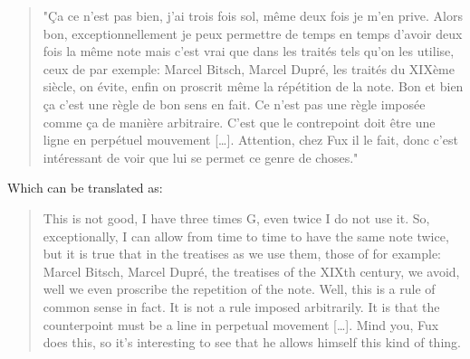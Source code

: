 \begin{quotation}
    "Ça ce n'est pas bien, j'ai trois fois sol, même deux fois je m'en prive. Alors bon, exceptionnellement je peux permettre de temps en temps d'avoir deux fois la même note mais c'est vrai que dans les traités tels qu'on les utilise, ceux de par exemple: Marcel Bitsch, Marcel Dupré, les traités du XIXème siècle, on évite, enfin on proscrit même la répétition de la note. Bon et bien ça c'est une règle de bon sens en fait. Ce n'est pas une règle imposée comme ça de manière arbitraire. C'est que le contrepoint doit être une ligne en perpétuel mouvement [\dots]. Attention, chez Fux il le fait, donc c'est intéressant de voir que lui se permet ce genre de choses."
    \textcite[Jean-Louis Fabre's opinion on the repetition of the same note in counterpoint.][1min 11]{ReglesJLFabre}
    \label{appen:JLFabreAvis}
\end{quotation}

Which can be translated as:
\begin{quotation}
    This is not good, I have three times G, even twice I do not use it. So, exceptionally, I can allow from time to time to have the same note twice, but it is true that in the treatises as we use them, those of for example: Marcel Bitsch, Marcel Dupré, the treatises of the XIXth century, we avoid, well we even proscribe the repetition of the note. Well, this is a rule of common sense in fact. It is not a rule imposed arbitrarily. It is that the counterpoint must be a line in perpetual movement [\dots]. Mind you, Fux does this, so it's interesting to see that he allows himself this kind of thing.
\end{quotation}